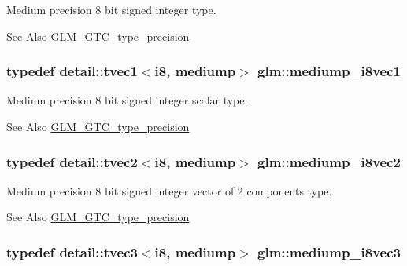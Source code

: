 Medium precision 8 bit signed integer type. \begin{DoxySeeAlso}{See Also}
\hyperlink{group__gtc__type__precision}{G\-L\-M\-\_\-\-G\-T\-C\-\_\-type\-\_\-precision} 
\end{DoxySeeAlso}
\hypertarget{group__gtc__type__precision_ga820f8b497e06d518968d00761747c547}{
\subsubsection[{mediump\-\_\-i8vec1}]{\setlength{\rightskip}{0pt plus 5cm}typedef detail\-::tvec1$<$i8, mediump$>$ {\bf glm\-::mediump\-\_\-i8vec1}}}\label{group__gtc__type__precision_ga820f8b497e06d518968d00761747c547}
Medium precision 8 bit signed integer scalar type. \begin{DoxySeeAlso}{See Also}
\hyperlink{group__gtc__type__precision}{G\-L\-M\-\_\-\-G\-T\-C\-\_\-type\-\_\-precision} 
\end{DoxySeeAlso}
\hypertarget{group__gtc__type__precision_ga38eba1ab306fe5cc5eeafa35ce5b5b26}{
\subsubsection[{mediump\-\_\-i8vec2}]{\setlength{\rightskip}{0pt plus 5cm}typedef detail\-::tvec2$<$i8, mediump$>$ {\bf glm\-::mediump\-\_\-i8vec2}}}\label{group__gtc__type__precision_ga38eba1ab306fe5cc5eeafa35ce5b5b26}
Medium precision 8 bit signed integer vector of 2 components type. \begin{DoxySeeAlso}{See Also}
\hyperlink{group__gtc__type__precision}{G\-L\-M\-\_\-\-G\-T\-C\-\_\-type\-\_\-precision} 
\end{DoxySeeAlso}
\hypertarget{group__gtc__type__precision_ga91b40a693c1db26a7cc544339b326df3}{
\subsubsection[{mediump\-\_\-i8vec3}]{\setlength{\rightskip}{0pt plus 5cm}typedef detail\-::tvec3$<$i8, mediump$>$ {\bf glm\-::mediump\-\_\-i8vec3}}}\label{group__gtc__type__precision_ga91b40a693c1db26a7cc544339b326df3}
